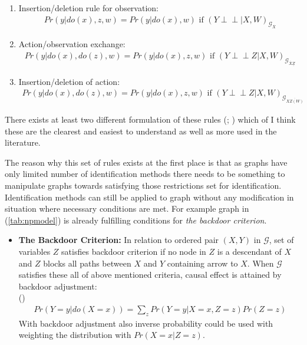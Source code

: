 \documentclass[main=english,12pt,a4paper,pdftex,econ,utf8]{aaltothesis}
\newcommand{\indep}{\perp \!\!\! \perp}
\newcommand{\g}{\mathcal{G}}
\begin{document}
\begin{enumerate}
    \item Insertion/deletion rule for observation:
        \begin{gather} \label{eq:do1}
            Pr(y|do(x),z,w)=Pr(y|do(x),w)\text{ if }(Y\indep |X,W)_{\g_{\overline{X}}}
        \end{gather}
    \item Action/observation exchange:
        \begin{gather} \label{eq:do2}
            Pr(y|do(x), do(z), w)=Pr(y|do(x),z,w)\text{ if }(Y\indep Z|X,W)_{\g_{\overline{X}\underline{Z}}}
        \end{gather}
    \item Insertion/deletion of action:
        \begin{gather} \label{eq:do3}
            Pr(y|do(x),do(z),w)=Pr(y|do(x),z,w)\text{ if }(Y\indep Z|X,W)_{\g_{\overline{XZ(W)}}}
        \end{gather}
    \label{list:do}
\end{enumerate}

\noindent There exists at least two different formulation of these rules (\cite{Jud1995}; \cite{Pearl2009a}) which of I think these are the clearest and easiest to understand as well as more used in the literature.

The reason why this set of rules exists at the first place is that as graphs have only limited number of identification methods there needs to be something to manipulate graphs towards satisfying those restrictions set for identification. Identification methods can still be applied to graph without any modification in situation where necessary conditions are met. For example graph in (\ref{tab:npmodel}) is already fulfilling conditions for \textit{the backdoor criterion}.

\begin{itemize}
    \item[] \textbf{The Backdoor Criterion:} In relation to ordered pair $(X,Y)$ in $\g$, set of variables $Z$ satisfies backdoor criterion if no node in $Z$ is a descendant of $X$ and $Z$ blocks all paths between $X$ and $Y$ containing arrow to $X$. When $\g$ satisfies these all of above mentioned criteria, causal effect is attained by backdoor adjustment: \\ 
    (\cite{Pearl2016})
    \begin{align}\label{eq:bd}
        Pr(Y=y|do(X=x))=\sum_{z}Pr(Y=y|X=x,Z=z)Pr(Z=z)
    \end{align}
    With backdoor adjustment also inverse probability could be used with weighting the distribution with $Pr(X=x|Z=z)$.
\end{itemize}
\end{document}
